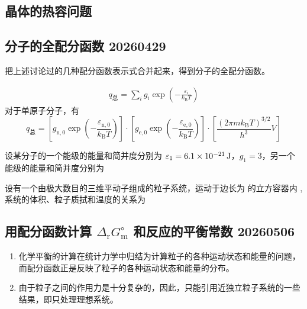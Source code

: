 \subsection{晶体的热容问题}

\subsection{分子的全配分函数 20260429}

把上述讨论过的几种配分函数表示式合并起来，得到分子的全配分函数。

\begin{equation}
    \begin{aligned}
        q_{\text{总}} = \sum_{i} g_i \exp\left(-\frac{\varepsilon_i}{k_\mathrm{B} T}\right)
    \end{aligned}
\end{equation}
对于单原子分子，有
\begin{equation}
    q_{\text{总}} = 
    \left[g_{\mathrm{n},0} \exp\left(-\frac{\varepsilon_{\mathrm{n},0}}{k_\mathrm{B} T}\right)\right] \cdot
    \left[g_{\mathrm{e},0} \exp\left(-\frac{\varepsilon_{\mathrm{e},0}}{k_\mathrm{B} T}\right)\right] \cdot
    \left[\frac{(2\pi m k_\mathrm{B} T)^{3/2}}{h^3} V\right]
\end{equation}

\begin{example} %
    设某分子的一个能级的能量和简并度分别为 $\varepsilon_1 = \qty{6.1E-21}{\joule}$，$g_1 = 3$，另一个能级的能量和简并度分别为
\end{example}

\begin{example} %
    设有一个由极大数目的三维平动子组成的粒子系统，运动于边长为 的立方容器内 ,系统的体积、粒子质拭和温度的关系为
\end{example}

\subsection[用配分函数计算 delta G 和反应的平衡常数 20260506]{用配分函数计算 $\Delta_{\mathrm{r}}G_{\mathrm{m}}^{\circ}$ 和反应的平衡常数 20260506}

\begin{enumerate}
    \item 化学平衡的计算在统计力学中归结为计算粒子的各种运动状态和能量的问题，而配分函数正是反映了粒子的各种运动状态和能量的分布。
    \item 由于粒子之间的作用力是十分复杂的，因此，只能引用近独立粒子系统的一些结果，即只处理理想系统。
\end{enumerate}

